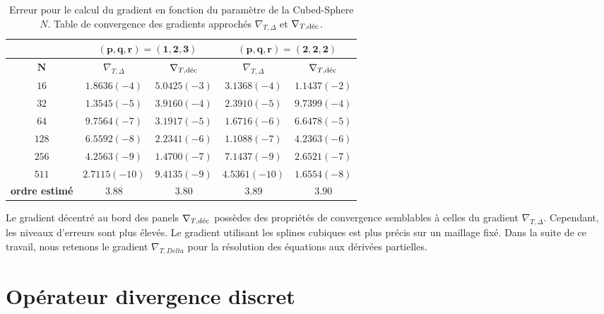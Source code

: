 \begin{table}[htbp]
\begin{center}
\begin{tabular}{|c||c|c||c|c|}
\hline
  & \multicolumn{2}{c||}{$\mathbf{(p,q,r)=(1,2,3)}$} & \multicolumn{2}{c|}{$\mathbf{(p,q,r)=(2,2,2)}$} \\
\hline
$\mathbf{N}$    &  $\nabla_{T,\Delta}$  & $\nabla_{T,\dec}$  &  $\nabla_{T,\Delta}$  & $\nabla_{T,\dec}$     \\
\hline
\hline
$16$   & $1.8636 (-4)$ & $5.0425 (-3)$ & $3.1368 (-4)$ & $1.1437 (-2)$ \\
$32$   & $1.3545 (-5)$ & $3.9160 (-4)$ & $2.3910 (-5)$ & $9.7399 (-4)$ \\
$64$   & $9.7564 (-7)$ & $3.1917 (-5)$ & $1.6716 (-6)$ & $6.6478 (-5)$ \\
$128$  & $6.5592 (-8)$ & $2.2341 (-6)$ & $1.1088 (-7)$ & $4.2363 (-6)$ \\
$256$  & $4.2563 (-9)$ & $1.4700 (-7)$ & $7.1437 (-9)$ & $2.6521 (-7)$ \\
$511$  & $2.7115(-10)$ & $9.4135 (-9)$ & $4.5361(-10)$ & $1.6554 (-8)$ \\
\hline
\hline
\textbf{ordre estimé} & $3.88$ & $3.80$ & $3.89$ & $3.90$\\
\hline 
\end{tabular}
\end{center}
\caption{Erreur pour le calcul du gradient en fonction du paramètre de la Cubed-Sphere $N$. Table de convergence des gradients approchés $\nabla_{T,\Delta}$ et $\nabla_{T,\dec}$.}
\label{tab:rate_grad3}
\end{table}

Le gradient décentré au bord des panels $\nabla_{T,\dec}$ possèdes des propriétés de convergence semblables à celles du gradient $\nabla_{T,\Delta}$. Cependant, les niveaux d'erreurs sont plus élevés. Le gradient utilisant les splines cubiques est plus précis sur un maillage fixé. Dans la suite de ce travail, nous retenons le gradient $\nabla_{T,Delta}$ pour la résolution des équations aux dérivées partielles.





















\section{Opérateur divergence discret}

